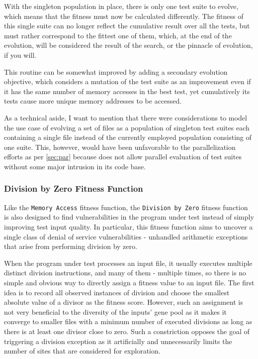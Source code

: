 With the singleton population in place, there is only one test suite to evolve, which means that the fitness
must now be calculated differently. The fitness of this single suite can no longer reflect the cumulative
result over all the tests, but must rather correspond to the fittest one of them, which, at the end of the
evolution, will be considered the result of the search, or the pinnacle of evolution, if you will.

This routine can be somewhat improved by adding a secondary evolution objective, which considers a
mutation of the test suite as an improvement even if it has the same number of memory accesses in the best
test, yet cumulatively its tests cause more unique memory addresses to be accessed. 

As a technical aside, I want to mention that there were considerations to model the use case of evolving a
set of files as a population of singleton test suites each containing a single file instead of the currently
employed population consisting of one suite. This, however, would have been unfavorable to the parallelization
efforts as per \cref{sec:par} because \evosuite does not allow parallel evaluation of test suites without some
major intrusion in its code base.
\subsubsection{Division by Zero Fitness Function}
Like the \texttt{Memory Access} fitness function, the \texttt{Division by Zero} fitness function is also
designed to find vulnerabilities in the program under test instead of simply improving test input quality. In
particular, this fitness function aims to uncover a single class of denial of service vulnerabilities -
unhandled arithmetic exceptions that arise from performing division by zero.

When the program under test processes an input file, it usually executes multiple distinct division
instructions, and many of them - multiple times, so there is no simple and obvious way to directly assign a
fitness value to an input file. The first idea is to record all observed instances of division and choose the
smallest absolute value of a divisor as the fitness score. However, such an assignment is not very beneficial
to the diversity of the inputs' gene pool as it makes it converge to smaller files with a minimum number of
executed divisions as long as there is at least one divisor close to zero. Such a constriction opposes the
goal of triggering a division exception as it artificially and unnecessarily limits the number of sites
that are considered for exploration. 

